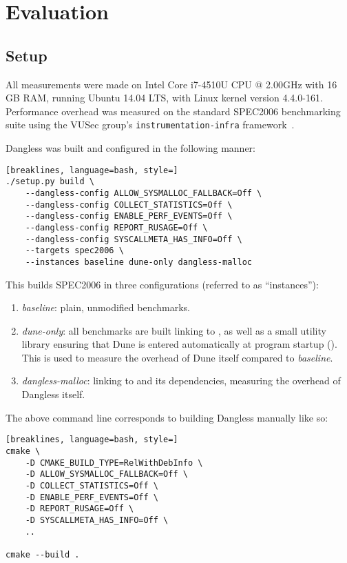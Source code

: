 
\chapter{Evaluation}

\section{Setup}

All measurements were made on Intel Core i7-4510U CPU @ 2.00GHz with 16 GB RAM, running Ubuntu 14.04 LTS, with Linux kernel version 4.4.0-161. Performance overhead was measured on the standard SPEC2006 benchmarking suite using the VUSec group's \texttt{instrumentation-infra} framework~\cite{vusec-infra}.

Dangless was built and configured in the following manner:

\begin{lstlisting}[breaklines, language=bash, style=]
./setup.py build \
	--dangless-config ALLOW_SYSMALLOC_FALLBACK=Off \
	--dangless-config COLLECT_STATISTICS=Off \
	--dangless-config ENABLE_PERF_EVENTS=Off \
	--dangless-config REPORT_RUSAGE=Off \
	--dangless-config SYSCALLMETA_HAS_INFO=Off \
	--targets spec2006 \
	--instances baseline dune-only dangless-malloc
\end{lstlisting}

This builds SPEC2006 in three configurations (referred to as ``instances''):
\begin{enumerate}
	\item \emph{baseline}: plain, unmodified benchmarks.
	\item \emph{dune-only}: all benchmarks are built linking to , as well as a small utility library ensuring that Dune is entered automatically at program startup (). This is used to measure the overhead of Dune itself compared to \emph{baseline}.
	\item \emph{dangless-malloc}: linking to  and its dependencies, measuring the overhead of Dangless itself.
\end{enumerate}

The above command line corresponds to building Dangless manually like so:

\begin{lstlisting}[breaklines, language=bash, style=]
cmake \
	-D CMAKE_BUILD_TYPE=RelWithDebInfo \
	-D ALLOW_SYSMALLOC_FALLBACK=Off \
	-D COLLECT_STATISTICS=Off \
	-D ENABLE_PERF_EVENTS=Off \
	-D REPORT_RUSAGE=Off \
	-D SYSCALLMETA_HAS_INFO=Off \
	..

cmake --build .
\end{lstlisting}

